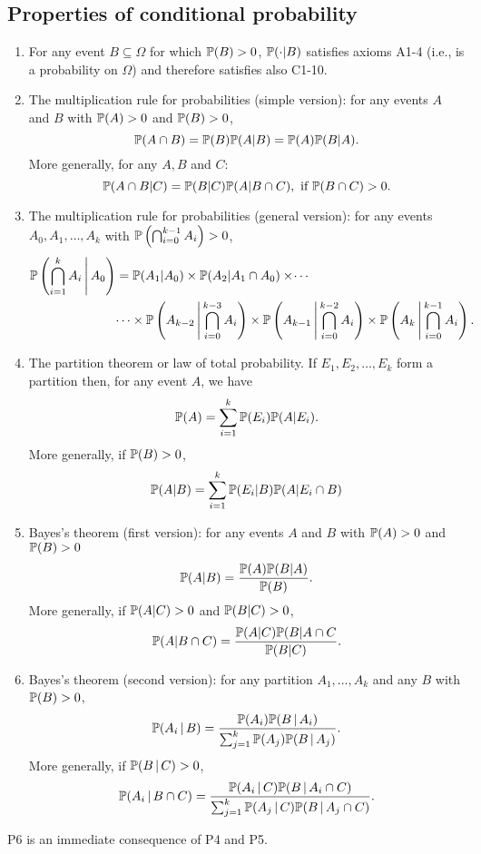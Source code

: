 \documentclass[10pt, a4paper]{article}
\begin{document}
\subsection{Properties of conditional probability}

\begin{enumerate}[label = P\arabic*]
    \item For any event $B \subseteq \Omega$ for which $\P (B) > 0$, $\P(\cdot | B)$ satisfies axioms A1-4 (i.e., is a probability on $\Omega$) and therefore satisfies also C1-10.

    \item The multiplication rule for probabilities (simple version): for any events $A$ and $B$ with $\P (A) > 0$ and $\P(B) > 0$,
    \[
    \P (A \cap B) = \P (B) \P(A | B) = \P(A) \P(B | A).
    \]
    More generally, for any $A, B$ and $C$:
    \[
    \P(A \cap B | C) = \P(B | C) \P(A | B \cap C),\text{ if } \P(B \cap C) > 0.
    \]

    \item The multiplication rule for probabilities (general version): for any events $A_0, A_1, \dotsc, A_k$ with $\P\left(\bigcap_{i = 0}^{k - 1}A_i\right) > 0$,
    \begin{align*}
    \P\left(\bigcap_{i = 1}^{k}A_i \,\middle|\, A_0\right) &= \P(A_1 | A_0) \times \P(A_2 | A_1 \cap A_0) \times \dotsi \\
    &\dotsi\times \P\left(A_{k - 2} \,\middle|\, \bigcap_{i = 0}^{k - 3}A_i\right) \times \P\left(A_{k - 1} \,\middle|\, \bigcap_{i = 0}^{k - 2}A_i\right) \times \P\left(A_{k} \,\middle|\, \bigcap_{i = 0}^{k - 1}A_i\right).
    \end{align*}
    \item The partition theorem or law of total probability. If $E_1, E_2, \dotsc, E_k$ form a partition then, for any event $A$, we have
    \[
    \P(A) = \sum_{i = 1}^{k}\P(E_i)\P(A | E_i).
    \]
    More generally, if $\P(B) > 0$,
    \[
    \P(A | B) = \sum_{i = 1}^{k}\P(E_i | B)\P(A | E_i \cap B)
    \]
    \item Bayes's theorem (first version): for any events $A$ and $B$ with $\P(A) > 0$ and $\P(B) > 0$
    \[
    \P(A | B) = \frac{\P(A)\P(B | A)}{\P(B)}.
    \]
    More generally, if $\P(A | C) > 0$ and $\P(B | C) > 0$,
    \[
    \P(A | B \cap C) = \frac{\P(A | C)\P(B | A \cap C}{\P(B | C)}.
    \]
    \item Bayes's theorem (second version):
    for any partition $A_1, \dotsc, A_k$ and any $B$ with $\P(B) > 0$,
    \[
    \P(A_i\,|\,B) = \frac{\P(A_i)\P(B\,|\,A_i)}{\sum_{j = 1}^{k}\P(A_j)\P(B\,|\,A_j)}.
    \]
    More generally,
    if $\P(B\,|\,C) > 0$,
    \[
    \P(A_i\,|\,B \cap C) = \frac{\P(A_i\,|\,C)\P(B\,|\,A_i \cap C)}{\sum_{j = 1}^{k}\P(A_j\,|\,C)\P(B\,|\,A_j \cap C)}.
    \]
\end{enumerate}
P6 is an immediate consequence of P4 and P5.
\end{document}
